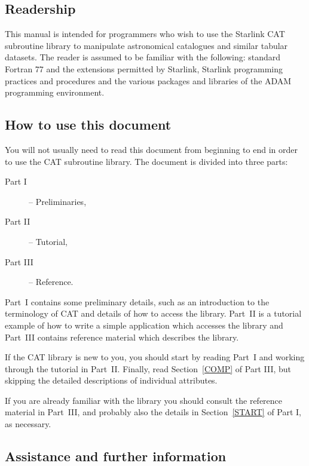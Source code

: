 \documentclass[11pt,twoside]{starlink}
\begin{document}
\scfrontmatter

\subsection*{Readership}

This manual is intended for programmers who wish to use the Starlink
CAT subroutine library to manipulate astronomical catalogues and
similar tabular datasets. The reader is assumed to be familiar with the
following: standard Fortran 77 and the extensions permitted by Starlink,
Starlink programming practices and procedures and the various packages
and libraries of the ADAM programming environment.


\subsection*{How to use this document}

You will not usually need to read this document from beginning to end in
order to use the CAT subroutine library. The document is divided into
three parts:

\begin{description}

   \item[{\rm Part I}] -- Preliminaries,

  \item[{\rm Part II}] -- Tutorial,

  \item[{\rm Part III}] -- Reference.

\end{description}

Part~I contains some preliminary details, such as an introduction to
the terminology of CAT and details of how to access the library.
Part~II is a tutorial example of how to write a simple application which
accesses the library and Part~III contains reference material which
describes the library.

If the CAT library is new to you, you should start by reading Part~I
and working through the tutorial in Part~II. Finally, read
Section~\ref{COMP} of Part III, but skipping the detailed descriptions
of individual attributes.

If you are already familiar with the library you should consult the
reference material in Part~III, and probably also the details in
Section~\ref{START} of Part I, as necessary.


\subsection*{Assistance and further information}
\end{document}
